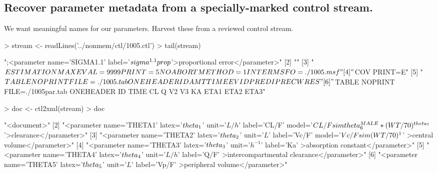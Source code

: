 \subsection{Recover parameter metadata from a specially-marked control stream.}
We want meaningful names for our parameters.  Harvest these from a reviewed control
stream.
\begin{Schunk}
\begin{Sinput}
> stream <- readLines('../nonmem/ctl/1005.ctl')
> tail(stream)
\end{Sinput}
\begin{Soutput}
[1] ";<parameter name='SIGMA1.1' label='$\\sigma^{1.1}prop$'>proportional error</parameter>"
[2] ""                                                                                      
[3] "$ESTIMATION MAXEVAL=9999 PRINT=5 NOABORT METHOD=1 INTER MSFO=./1005.msf"               
[4] "$COV PRINT=E"                                                                          
[5] "$TABLE NOPRINT FILE=./1005.tab ONEHEADER ID AMT TIME EVID PRED IPRE CWRES"             
[6] "$TABLE NOPRINT FILE=./1005par.tab ONEHEADER ID TIME CL Q V2 V3 KA ETA1 ETA2 ETA3"      
\end{Soutput}
\begin{Sinput}
> doc <- ctl2xml(stream)
> doc
\end{Sinput}
\begin{Soutput}
 [1] "<document>"                                                                                                                                                 
 [2] "<parameter name='THETA1' latex='$\\theta_1$' unit='$L/h$'    label='CL/F' model='$CL/F \\sim \\theta_6^{MALE} * (WT/70)^{\\theta_7}$'>clearance</parameter>"
 [3] "<parameter name='THETA2' latex='$\\theta_2$' unit='$L$'      label='Vc/F' model='$Vc/F \\sim (WT/70)^{1}$'   >central volume</parameter>"                   
 [4] "<parameter name='THETA3' latex='$\\theta_3$' unit='$h^{-1}$' label='Ka'                                     >absorption constant</parameter>"               
 [5] "<parameter name='THETA4' latex='$\\theta_4$' unit='$L/h$'    label='Q/F'                                    >intercompartmental clearance</parameter>"      
 [6] "<parameter name='THETA5' latex='$\\theta_5$' unit='$L$'      label='Vp/F'                                   >peripheral volume</parameter>"                 

\end{Soutput}
\end{Schunk}
